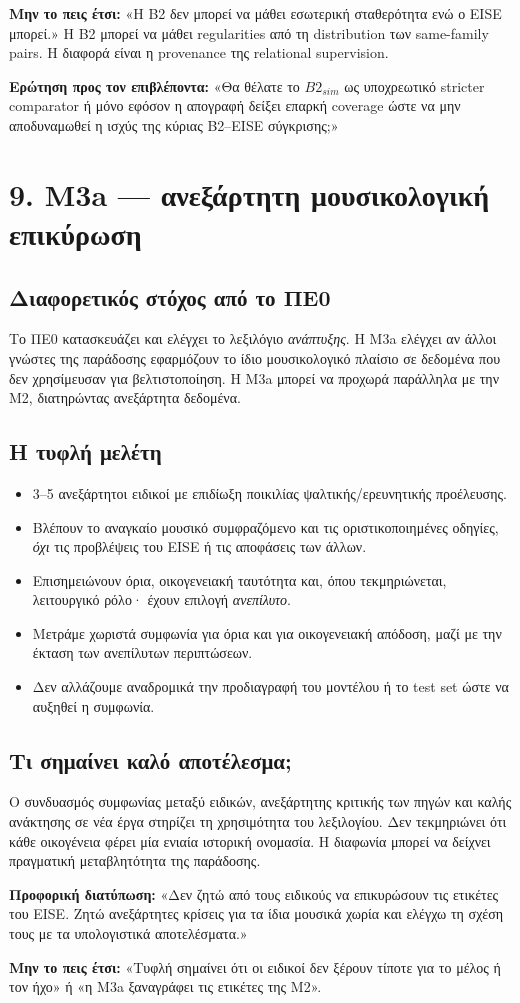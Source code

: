 \documentclass[9pt,a4paper]{extarticle}
\newcommand{\say}[1]{\begin{keybox}\textbf{Προφορική διατύπωση:} #1\end{keybox}}
\newcommand{\avoid}[1]{\begin{redline}\textbf{Μην το πεις έτσι:} #1\end{redline}}
\newcommand{\ask}[1]{\begin{warnbox}\textbf{Ερώτηση προς τον επιβλέποντα:} #1\end{warnbox}}
\begin{document}
\avoid{«Η B2 δεν μπορεί να μάθει εσωτερική σταθερότητα ενώ ο EISE μπορεί.» Η B2 μπορεί να μάθει regularities από τη distribution των same-family pairs. Η διαφορά είναι η provenance της relational supervision.}

\ask{«Θα θέλατε το \(B2_{sim}\) ως υποχρεωτικό stricter comparator ή μόνο εφόσον η απογραφή δείξει επαρκή coverage ώστε να μην αποδυναμωθεί η ισχύς της κύριας B2--EISE σύγκρισης;»}

\newpage
\section*{9. M3a — ανεξάρτητη μουσικολογική επικύρωση}
\subsection*{Διαφορετικός στόχος από το ΠΕ0}
Το ΠΕ0 κατασκευάζει και ελέγχει το λεξιλόγιο \emph{ανάπτυξης}. Η M3a ελέγχει αν άλλοι γνώστες της παράδοσης εφαρμόζουν το ίδιο μουσικολογικό πλαίσιο σε δεδομένα που δεν χρησίμευσαν για βελτιστοποίηση. Η M3a μπορεί να προχωρά παράλληλα με την M2, διατηρώντας ανεξάρτητα δεδομένα.
\subsection*{Η τυφλή μελέτη}
\begin{itemize}
\item 3--5 ανεξάρτητοι ειδικοί με επιδίωξη ποικιλίας ψαλτικής/ερευνητικής προέλευσης.
\item Βλέπουν το αναγκαίο μουσικό συμφραζόμενο και τις οριστικοποιημένες οδηγίες, \emph{όχι} τις προβλέψεις του EISE ή τις αποφάσεις των άλλων.
\item Επισημειώνουν όρια, οικογενειακή ταυτότητα και, όπου τεκμηριώνεται, λειτουργικό ρόλο· έχουν επιλογή \emph{ανεπίλυτο}.
\item Μετράμε χωριστά συμφωνία για όρια και για οικογενειακή απόδοση, μαζί με την έκταση των ανεπίλυτων περιπτώσεων.
\item Δεν αλλάζουμε αναδρομικά την προδιαγραφή του μοντέλου ή το test set ώστε να αυξηθεί η συμφωνία.
\end{itemize}
\subsection*{Τι σημαίνει καλό αποτέλεσμα;}
Ο συνδυασμός συμφωνίας μεταξύ ειδικών, ανεξάρτητης κριτικής των πηγών και καλής ανάκτησης σε νέα έργα στηρίζει τη χρησιμότητα του λεξιλογίου. Δεν τεκμηριώνει ότι κάθε οικογένεια φέρει μία ενιαία ιστορική ονομασία. Η διαφωνία μπορεί να δείχνει πραγματική μεταβλητότητα της παράδοσης.
\say{«Δεν ζητώ από τους ειδικούς να επικυρώσουν τις ετικέτες του EISE. Ζητώ ανεξάρτητες κρίσεις για τα ίδια μουσικά χωρία και ελέγχω τη σχέση τους με τα υπολογιστικά αποτελέσματα.»}
\avoid{«Τυφλή σημαίνει ότι οι ειδικοί δεν ξέρουν τίποτε για το μέλος ή τον ήχο» ή «η M3a ξαναγράφει τις ετικέτες της M2».}
\newpage
\end{document}

